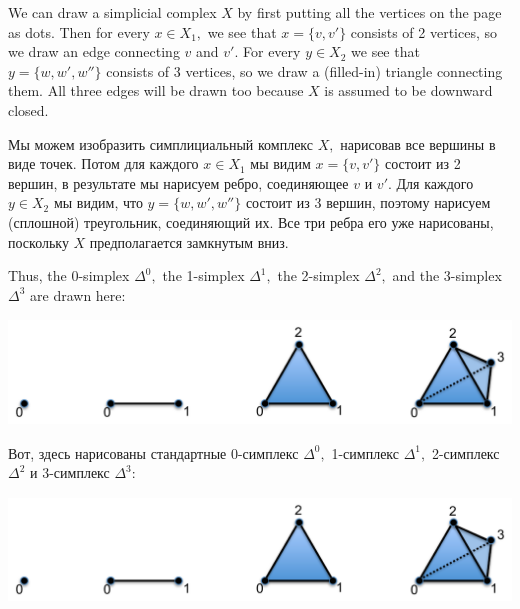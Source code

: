 \documentclass[CT4S-EN-RU]{subfiles}
\begin{document}
\begin{blockENG}
We can draw a simplicial complex $X$ by first putting all the vertices on the page as dots. Then for every $x\in X_1,$ we see that $x=\{v,v'\}$ consists of 2 vertices, so we draw an edge connecting $v$ and $v'.$ For every $y\in X_2$ we see that $y=\{w,w',w''\}$ consists of 3 vertices, so we draw a (filled-in) triangle connecting them. All three edges will be drawn too because $X$ is assumed to be downward closed.
\end{blockENG}

\begin{blockRUS}
Мы можем изобразить симплициальный комплекс $X,$ нарисовав все вершины в виде точек. Потом для каждого $x\in X_1$ мы видим $x=\{v,v'\}$ состоит из 2 вершин, в результате мы нарисуем ребро, соединяющее $v$ и $v'.$ Для каждого $y\in X_2$ мы видим, что $y=\{w,w',w''\}$ состоит из 3 вершин, поэтому нарисуем (сплошной) треугольник, соединяющий их. Все три ребра его уже нарисованы, поскольку $X$ предполагается замкнутым вниз.
\end{blockRUS}

\begin{blockENG}
Thus, the 0-simplex $\Delta^0,$ the 1-simplex $\Delta^1,$ the 2-simplex $\Delta^2,$ and the 3-simplex $\Delta^3$ are drawn here:
\begin{center}
\includegraphics[height=1.1in]{simplices}
\end{center} 
\end{blockENG}

\begin{blockRUS}
Вот, здесь нарисованы стандартные 0-симплекс $\Delta^0,$ 1-симплекс $\Delta^1,$ 2-симплекс $\Delta^2$ и 3-симплекс $\Delta^3$:
\begin{center}
\includegraphics[height=1.1in]{simplices}
\end{center} 
\end{blockRUS}
\end{document}
